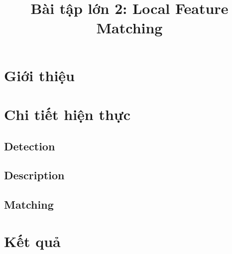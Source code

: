 \documentclass[11pt]{article}
\date{}
\title{\vspace{-1cm}Bài tập lớn 2: Local Feature Matching}
\begin{document}
\maketitle
\vspace{-2cm}
\thispagestyle{fancy}

\section*{Giới thiệu}

\section*{Chi tiết hiện thực}
\subsection*{Detection}

\subsection*{Description}

\subsection*{Matching}

\section*{Kết quả}
\end{document}

